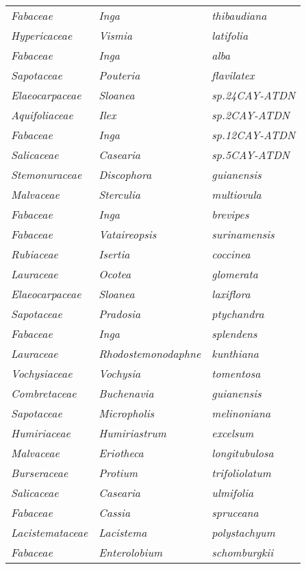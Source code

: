 \documentclass[fleqn,10pt]{ArtEcoFoG} %
\renewenvironment{table}{\begin{table*}}{\end{table*}\ignorespacesafterend}
\begin{document}
\begin{table}
\begin{tabular}[t]{lll}
\em{Fabaceae} & \em{Inga} & \em{thibaudiana}\\
\em{Hypericaceae} & \em{Vismia} & \em{latifolia}\\
\em{Fabaceae} & \em{Inga} & \em{alba}\\
\em{Sapotaceae} & \em{Pouteria} & \em{flavilatex}\\
\addlinespace
\em{Elaeocarpaceae} & \em{Sloanea} & \em{sp.24CAY-ATDN}\\
\em{Aquifoliaceae} & \em{Ilex} & \em{sp.2CAY-ATDN}\\
\em{Fabaceae} & \em{Inga} & \em{sp.12CAY-ATDN}\\
\em{Salicaceae} & \em{Casearia} & \em{sp.5CAY-ATDN}\\
\em{Stemonuraceae} & \em{Discophora} & \em{guianensis}\\
\addlinespace
\em{Malvaceae} & \em{Sterculia} & \em{multiovula}\\
\em{Fabaceae} & \em{Inga} & \em{brevipes}\\
\em{Fabaceae} & \em{Vataireopsis} & \em{surinamensis}\\
\em{Rubiaceae} & \em{Isertia} & \em{coccinea}\\
\em{Lauraceae} & \em{Ocotea} & \em{glomerata}\\
\addlinespace
\em{Elaeocarpaceae} & \em{Sloanea} & \em{laxiflora}\\
\em{Sapotaceae} & \em{Pradosia} & \em{ptychandra}\\
\em{Fabaceae} & \em{Inga} & \em{splendens}\\
\em{Lauraceae} & \em{Rhodostemonodaphne} & \em{kunthiana}\\
\em{Vochysiaceae} & \em{Vochysia} & \em{tomentosa}\\
\addlinespace
\em{Combretaceae} & \em{Buchenavia} & \em{guianensis}\\
\em{Sapotaceae} & \em{Micropholis} & \em{melinoniana}\\
\em{Humiriaceae} & \em{Humiriastrum} & \em{excelsum}\\
\em{Malvaceae} & \em{Eriotheca} & \em{longitubulosa}\\
\em{Burseraceae} & \em{Protium} & \em{trifoliolatum}\\
\addlinespace
\em{Salicaceae} & \em{Casearia} & \em{ulmifolia}\\
\em{Fabaceae} & \em{Cassia} & \em{spruceana}\\
\em{Lacistemataceae} & \em{Lacistema} & \em{polystachyum}\\
\em{Fabaceae} & \em{Enterolobium} & \em{schomburgkii}\\

\end{tabular}
\end{table}
\end{document}
